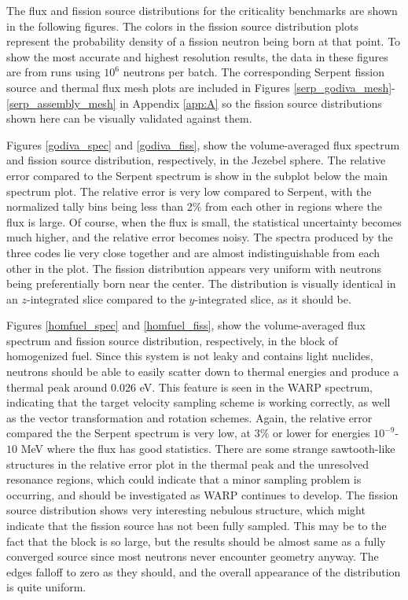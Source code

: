 The flux and fission source distributions for the criticality benchmarks are shown in the following figures.  The colors in the fission source distribution plots represent the probability density of a fission neutron being born at that point.  To show the most accurate and highest resolution results, the data in these figures are from runs using $10^6$ neutrons per batch.  The corresponding Serpent fission source and thermal flux mesh plots are included in Figures \ref{serp_godiva_mesh}-\ref{serp_assembly_mesh} in Appendix \ref{app:A} so the fission source distributions shown here can be visually validated against them.  

Figures \ref{godiva_spec} and \ref{godiva_fiss}, show the volume-averaged flux spectrum and fission source distribution, respectively, in the Jezebel sphere.  The relative error compared to the Serpent spectrum is show in the subplot below the main spectrum plot.  The relative error is very low compared to Serpent, with the normalized tally bins being less than 2\% from each other in regions where the flux is large.  Of course, when the flux is small, the statistical uncertainty becomes much higher, and the relative error becomes noisy.  The spectra produced by the three codes lie very close together and are almost indistinguishable from each other in the plot.  The fission distribution appears very uniform with neutrons being preferentially born near the center.  The distribution is visually identical in an $z$-integrated slice compared to the $y$-integrated slice, as it should be.

Figures \ref{homfuel_spec} and \ref{homfuel_fiss}, show the volume-averaged flux spectrum and fission source distribution, respectively, in the block of homogenized fuel.  Since this system is not leaky and contains light nuclides, neutrons should be able to easily scatter down to thermal energies and produce a thermal peak around 0.026 eV.  This feature is seen in the WARP spectrum, indicating that the target velocity sampling scheme is working correctly, as well as the vector transformation and rotation schemes.  Again, the relative error compared the the Serpent spectrum is very low, at 3\% or lower for energies $10^{-9}$-$10$ MeV where the flux has good statistics.  There are some strange sawtooth-like structures in the relative error plot in the thermal peak and the unresolved resonance regions, which could indicate that a minor sampling problem is occurring, and should be investigated as WARP continues to develop.  The fission source distribution shows very interesting nebulous structure, which might indicate that the fission source has not been fully sampled.  This may be to the fact that the block is so large, but the results should be almost same as a fully converged source since most neutrons never encounter geometry anyway.  The edges falloff to zero as they should, and the overall appearance of the distribution is quite uniform.

